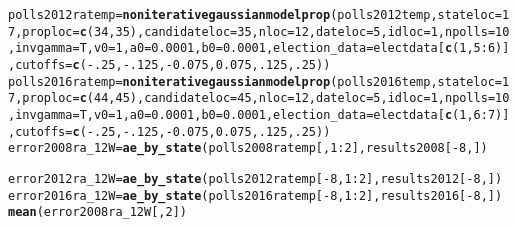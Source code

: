 \documentclass{article}\usepackage[]{graphicx}\usepackage[]{color}
\makeatletter
\newcommand{\hlnum}[1]{\textcolor[rgb]{0.686,0.059,0.569}{#1}}%
\newcommand{\hlopt}[1]{\textcolor[rgb]{0,0,0}{#1}}%
\newcommand{\hlstd}[1]{\textcolor[rgb]{0.345,0.345,0.345}{#1}}%
\newcommand{\hlkwb}[1]{\textcolor[rgb]{0.69,0.353,0.396}{#1}}%
\newcommand{\hlkwc}[1]{\textcolor[rgb]{0.333,0.667,0.333}{#1}}%
\newcommand{\hlkwd}[1]{\textcolor[rgb]{0.737,0.353,0.396}{\textbf{#1}}}%
\newenvironment{kframe}{%
 \def\at@end@of@kframe{}%
 \ifinner\ifhmode%
  \def\at@end@of@kframe{\end{minipage}}%
  \begin{minipage}{\columnwidth}%
 \fi\fi%
 \def\FrameCommand##1{\hskip\@totalleftmargin \hskip-\fboxsep
 \colorbox{shadecolor}{##1}\hskip-\fboxsep
     \hskip-\linewidth \hskip-\@totalleftmargin \hskip\columnwidth}%
 \MakeFramed {\advance\hsize-\width
   \@totalleftmargin\z@ \linewidth\hsize
   \@setminipage}}%
 {\par\unskip\endMakeFramed%
 \at@end@of@kframe}
\newenvironment{knitrout}{}{} %
\makeatother
\begin{document}
\begin{knitrout}
\begin{kframe}
\begin{alltt}
\hlstd{polls2012ratemp} \hlkwb{=} \hlkwd{noniterativegaussianmodelprop}\hlstd{(polls2012temp,} \hlkwc{stateloc} \hlstd{=} \hlnum{17}\hlstd{,} \hlkwc{proploc} \hlstd{=} \hlkwd{c}\hlstd{(}\hlnum{34}\hlstd{,} \hlnum{35}\hlstd{),} \hlkwc{candidateloc} \hlstd{=} \hlnum{35}\hlstd{,}  \hlkwc{nloc} \hlstd{=} \hlnum{12}\hlstd{,} \hlkwc{dateloc} \hlstd{=} \hlnum{5}\hlstd{,} \hlkwc{idloc} \hlstd{=} \hlnum{1}\hlstd{,}  \hlkwc{npolls} \hlstd{=} \hlnum{10}\hlstd{,}\hlkwc{invgamma} \hlstd{= T,} \hlkwc{v0}\hlstd{=}\hlnum{1}\hlstd{,} \hlkwc{a0}\hlstd{=}\hlnum{0.0001}\hlstd{,} \hlkwc{b0}\hlstd{=}\hlnum{0.0001}\hlstd{,}  \hlkwc{election_data} \hlstd{= electdata[}\hlkwd{c}\hlstd{(}\hlnum{1}\hlstd{,} \hlnum{5}\hlopt{:}\hlnum{6}\hlstd{)],} \hlkwc{cutoffs} \hlstd{=} \hlkwd{c}\hlstd{(}\hlopt{-}\hlnum{.25}\hlstd{,} \hlopt{-}\hlnum{.125}\hlstd{,} \hlopt{-}\hlnum{0.075}\hlstd{,} \hlnum{0.075}\hlstd{,} \hlnum{.125}\hlstd{,} \hlnum{.25}\hlstd{))}
\hlstd{polls2016ratemp} \hlkwb{=} \hlkwd{noniterativegaussianmodelprop}\hlstd{(polls2016temp,} \hlkwc{stateloc} \hlstd{=} \hlnum{17}\hlstd{,} \hlkwc{proploc} \hlstd{=} \hlkwd{c}\hlstd{(}\hlnum{44}\hlstd{,} \hlnum{45}\hlstd{),} \hlkwc{candidateloc} \hlstd{=} \hlnum{45}\hlstd{,} \hlkwc{nloc} \hlstd{=} \hlnum{12}\hlstd{,} \hlkwc{dateloc} \hlstd{=} \hlnum{5}\hlstd{,} \hlkwc{idloc} \hlstd{=} \hlnum{1}\hlstd{,}\hlkwc{npolls} \hlstd{=} \hlnum{10}\hlstd{,} \hlkwc{invgamma} \hlstd{= T,} \hlkwc{v0}\hlstd{=}\hlnum{1}\hlstd{,} \hlkwc{a0}\hlstd{=}\hlnum{0.0001}\hlstd{,} \hlkwc{b0}\hlstd{=}\hlnum{0.0001}\hlstd{,} \hlkwc{election_data} \hlstd{= electdata[}\hlkwd{c}\hlstd{(}\hlnum{1}\hlstd{,} \hlnum{6}\hlopt{:}\hlnum{7}\hlstd{)],} \hlkwc{cutoffs} \hlstd{=} \hlkwd{c}\hlstd{(}\hlopt{-}\hlnum{.25}\hlstd{,} \hlopt{-}\hlnum{.125}\hlstd{,} \hlopt{-}\hlnum{0.075}\hlstd{,} \hlnum{0.075}\hlstd{,} \hlnum{.125}\hlstd{,} \hlnum{.25}\hlstd{))}
\hlstd{error2008ra_12W} \hlkwb{=} \hlkwd{ae_by_state}\hlstd{(polls2008ratemp[,} \hlnum{1}\hlopt{:}\hlnum{2}\hlstd{], results2008[}\hlopt{-}\hlnum{8}\hlstd{, ])}
\end{alltt}


{\ttfamily\noindent\color{warningcolor}{\#\# Warning in ae\_by\_state(polls2008ratemp[, 1:2], results2008[-8, ]): Predicted names do not match names of actual data}}

{\ttfamily\noindent\bfseries\color{errorcolor}{\#\# Error in ae\_by\_state(polls2008ratemp[, 1:2], results2008[-8, ]): Incompatiable dimensions of predicted and actual}}\begin{alltt}
\hlstd{error2012ra_12W} \hlkwb{=} \hlkwd{ae_by_state}\hlstd{(polls2012ratemp[}\hlopt{-}\hlnum{8}\hlstd{,} \hlnum{1}\hlopt{:}\hlnum{2}\hlstd{], results2012[}\hlopt{-}\hlnum{8}\hlstd{, ])}
\hlstd{error2016ra_12W} \hlkwb{=} \hlkwd{ae_by_state}\hlstd{(polls2016ratemp[}\hlopt{-}\hlnum{8}\hlstd{,} \hlnum{1}\hlopt{:}\hlnum{2}\hlstd{], results2016[}\hlopt{-}\hlnum{8}\hlstd{, ])}
\hlkwd{mean}\hlstd{(error2008ra_12W[,}\hlnum{2}\hlstd{])}
\end{alltt}



\end{kframe}
\end{knitrout}
\end{document}
